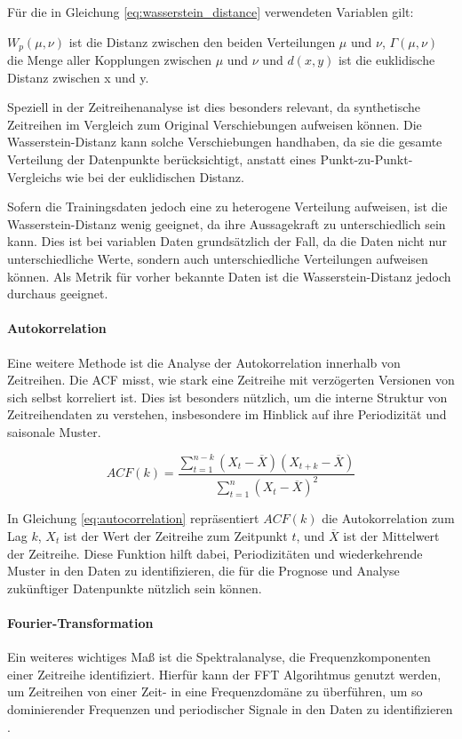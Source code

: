 Für die in Gleichung \ref{eq:wasserstein_distance} verwendeten Variablen gilt:

\(W_p(\mu, \nu)\) ist die Distanz zwischen den beiden Verteilungen \(\mu\) und \(\nu\), \(\Gamma(\mu, \nu)\) die Menge aller Kopplungen zwischen \(\mu\) und \(\nu\) und \(d(x, y)\) ist die euklidische Distanz zwischen x und y.

Speziell in der Zeitreihenanalyse ist dies besonders relevant, da synthetische Zeitreihen im Vergleich zum Original Verschiebungen aufweisen können. 
Die Wasserstein-Distanz kann solche Verschiebungen handhaben, da sie die gesamte Verteilung der Datenpunkte berücksichtigt, anstatt eines Punkt-zu-Punkt-Vergleichs wie bei der euklidischen Distanz.

Sofern die Trainingsdaten jedoch eine zu heterogene Verteilung aufweisen, ist die Wasserstein-Distanz wenig geeignet, 
da ihre Aussagekraft zu unterschiedlich sein kann. Dies ist bei variablen Daten grundsätzlich der Fall, da die Daten nicht nur unterschiedliche Werte, 
sondern auch unterschiedliche Verteilungen aufweisen können. Als Metrik für vorher bekannte Daten ist die Wasserstein-Distanz jedoch durchaus geeignet.

\paragraph{Autokorrelation}
Eine weitere Methode ist die Analyse der Autokorrelation\cite{statistikguru} innerhalb von Zeitreihen. 
Die \acf{ACF} misst, wie stark eine Zeitreihe mit verzögerten Versionen von sich selbst korreliert ist. 
Dies ist besonders nützlich, um die interne Struktur von Zeitreihendaten zu verstehen, insbesondere im Hinblick auf ihre Periodizität und saisonale Muster.

\begin{equation}
    \label{eq:autocorrelation}
    ACF(k) = \frac{\sum_{t=1}^{n-k} (X_t - \overline{X})(X_{t+k} - \overline{X})}{\sum_{t=1}^{n} (X_t - \overline{X})^2}
\end{equation}

In Gleichung \ref{eq:autocorrelation} repräsentiert \( ACF(k) \) die Autokorrelation zum Lag \( k \), \( X_t \) ist der Wert der Zeitreihe zum Zeitpunkt \( t \), und \( \overline{X} \) ist der Mittelwert der Zeitreihe. 
Diese Funktion hilft dabei, Periodizitäten und wiederkehrende Muster in den Daten zu identifizieren, die für die Prognose und Analyse zukünftiger Datenpunkte nützlich sein können.

\paragraph{Fourier-Transformation}
Ein weiteres wichtiges Maß ist die Spektralanalyse, die Frequenzkomponenten einer Zeitreihe identifiziert. 
Hierfür kann der \acf{FFT} Algorihtmus genutzt werden, um Zeitreihen von einer Zeit- in eine Frequenzdomäne zu überführen, um so dominierender Frequenzen und periodischer Signale in den Daten zu identifizieren \cite{szeliski2011computer}.

